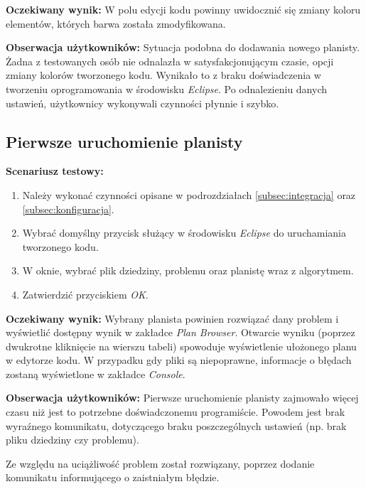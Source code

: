 \textbf{Oczekiwany wynik:} W polu edycji kodu powinny uwidocznić się zmiany koloru elementów, których barwa została zmodyfikowana.

\textbf{Obserwacja użytkowników:} Sytuacja podobna do dodawania nowego planisty. Żadna z testowanych osób nie odnalazła w satysfakcjonującym czasie, opcji zmiany kolorów tworzonego kodu. Wynikało to z braku doświadczenia w tworzeniu oprogramowania w środowisku \textit{Eclipse}. Po odnalezieniu danych ustawień, użytkownicy wykonywali czynności płynnie i szybko. 
\subsection{Pierwsze uruchomienie planisty}
\textbf{Scenariusz testowy:}
  \begin{enumerate}
  
\item Należy wykonać czynności opisane w podrozdziałach \ref{subsec:integracja} oraz \ref{subsec:konfiguracja}.
\item Wybrać domyślny przycisk służący w środowisku \textit{Eclipse} do uruchamiania tworzonego kodu.
\item W oknie, wybrać plik dziedziny, problemu oraz planistę wraz z algorytmem.
\item Zatwierdzić przyciskiem \textit{OK}. 
\end{enumerate}

\textbf{Oczekiwany wynik:} Wybrany planista powinien rozwiązać dany problem i wyświetlić dostępny wynik w zakładce \textit{Plan Browser}. Otwarcie wyniku (poprzez dwukrotne kliknięcie na wierszu tabeli) spowoduje wyświetlenie ułożonego planu w edytorze kodu. W przypadku gdy pliki są niepoprawne, informacje o błędach zostaną wyświetlone w zakładce \textit{Console}. 

\textbf{Obserwacja użytkowników:} Pierwsze uruchomienie planisty zajmowało więcej czasu niż jest to potrzebne doświadczonemu programiście. Powodem jest brak wyraźnego komunikatu, dotyczącego braku poszczególnych ustawień (np. brak pliku dziedziny czy problemu).

Ze względu na uciążliwość problem został rozwiązany, poprzez dodanie komunikatu informującego o zaistniałym błędzie.



